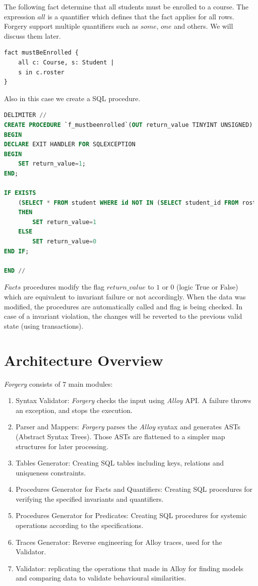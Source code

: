\documentclass[oneside]{book}
\begin{document}
The following fact determine that all students must be enrolled to a course. The expression $all$ is a quantifier which defines that the fact applies for all rows. Forgery support multiple quantifiers such as $some$, $one$ and others. We will discuss them later.

\begin{lstlisting}
fact mustBeEnrolled {
	all c: Course, s: Student | 
	s in c.roster
}
\end{lstlisting}

Also in this case we create a SQL procedure.

\begin{lstlisting}[escapechar=@,language=SQL]
DELIMITER //
CREATE PROCEDURE `f_mustbeenrolled`(OUT return_value TINYINT UNSIGNED)
BEGIN
DECLARE EXIT HANDLER FOR SQLEXCEPTION
BEGIN
	SET return_value=1;
END;

IF EXISTS
	(SELECT * FROM student WHERE id NOT IN (SELECT student_id FROM roster))
	THEN
		SET return_value=1
	ELSE
		SET return_value=0
END IF;
	
END //
\end{lstlisting}

$Facts$ procedures modify the flag $return\_value$ to $1$ or $0$ (logic True or False) which are equivalent to invariant failure or not accordingly. When the data was modified, the procedures are automatically called and flag is being checked. In case of a invariant violation, the changes will be reverted to the previous valid state (using transactions).\\

\newpage

\section{Architecture Overview}

\textit{Forgery} consists of 7 main modules:
\begin{enumerate}
	\item Syntax Validator: \textit{Forgery} checks the input using \textit{Alloy} API. A failure throws an exception, and stops the execution.
	\item Parser and Mappers: \textit{Forgery} parses the \textit{Alloy} syntax and generates ASTs (Abstract Syntax Trees). Those ASTs are flattened to a simpler map structures for later processing.
	\item Tables Generator: Creating SQL tables including keys, relations and uniqueness constraints.
	\item Procedures Generator for Facts and Quantifiers: Creating SQL procedures for verifying the specified invariants and quantifiers. 
	\item Procedures Generator for Predicates: Creating SQL procedures for systemic operations according to the specifications.
	\item Traces Generator: Reverse engineering for Alloy traces, used for the Validator.
	\item Validator: replicating the operations that made in Alloy for finding models and comparing data to validate behavioural similarities.
\end{enumerate}
\end{document}
